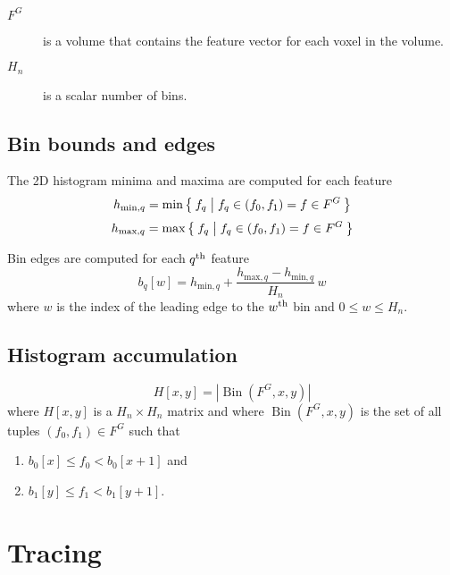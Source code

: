 \documentclass[12pt]{article}
\newcommand{\Dim}[1]{\ensuremath{\left|#1\right|}}
\begin{document}
\begin{description}
	\item[\(F^{G}\)] is a volume that contains the feature vector for each
		voxel in the volume.
	\item[\(H_n\)] is a scalar number of bins.
\end{description}

\subsection{Bin bounds and edges}

The 2D histogram minima and maxima are computed for each feature
\begin{dmath*}
	h_{\mathrm{min},q} = \min \Set{ f_q | f_q \in ( f_0, f_1 ) = f \in F^{G} }
\end{dmath*}
\begin{dmath*}
	h_{\mathrm{max},q} = \max \Set{ f_q | f_q \in ( f_0, f_1 ) = f \in F^{G} }
\end{dmath*}

Bin edges are computed for each \(q^{\mathrm{th}}\) feature
\begin{dmath*}
	b_q[w] =
		h_{\mathrm{min},q} +
		\frac{ h_{\mathrm{max},q}  - h_{\mathrm{min},q}  }
		     { H_n } \, w
\end{dmath*}
where \(w\) is the index of the leading edge to the
\(w^{\mathrm{th}}\) bin and \( 0 \le w \le  H_n \).

\subsection{Histogram accumulation}

\begin{dmath*}
	H[x,y] =  \Dim{ \operatorname{Bin}(F^G, x, y) }
\end{dmath*}
where \(H[x,y]\) is a \(H_n \times H_n\) matrix and
where \(\operatorname{Bin}(F^G, x, y)\) is the set of all tuples
\((f_0, f_1) \in F^G\) such that
\begin{enumerate}
	\item \(b_0[x] \le f_0 < b_0[x+1]\) and
	\item \(b_1[y] \le f_1 < b_1[y+1]\).
\end{enumerate}



\section{Tracing}
\end{document}

